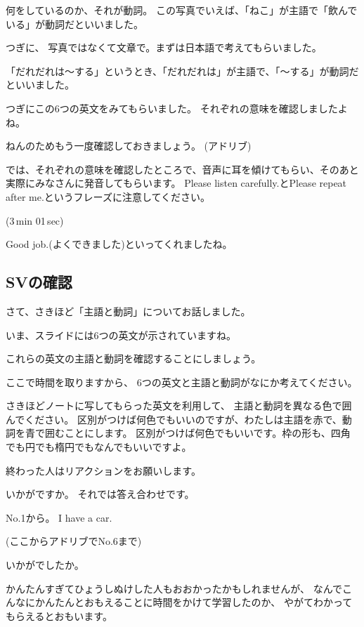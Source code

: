 \documentclass[book,jafontscale=0.9247]{jlreq}
\begin{document}
何をしているのか、それが動詞。
この写真でいえば、「ねこ」が主語で「飲んでいる」が動詞だといいました。

{\large \ComputerMouse}

つぎに、
写真ではなくて文章で。まずは日本語で考えてもらいました。

「だれだれは〜する」というとき、「だれだれは」が主語で、「〜する」が動詞だといいました。

{\large \ComputerMouse}

つぎにこの6つの英文をみてもらいました。
それぞれの意味を確認しましたよね。

ねんのためもう一度確認しておきましょう。
(アドリブ)

では、それぞれの意味を確認したところで、音声に耳を傾けてもらい、そのあと実際にみなさんに発音してもらいます。
Please listen carefully.とPlease repeat after me.というフレーズに注意してください。





\faVolumeUp{}(3\,min 01\,sec)

Good job.(よくできました)といってくれましたね。


\subsection{SVの確認}

さて、さきほど「主語と動詞」についてお話しました。

いま、スライドには6つの英文が示されていますね。

これらの英文の主語と動詞を確認することにしましょう。

ここで時間を取りますから、
6つの英文と主語と動詞がなにか考えてください。

さきほどノートに写してもらった英文を利用して、
主語と動詞を異なる色で囲んでください。
区別がつけば何色でもいいのですが、わたしは主語を赤で、動詞を青で囲むことにします。
区別がつけば何色でもいいです。枠の形も、四角でも円でも楕円でもなんでもいいですよ。

終わった人はリアクションをお願いします。

いかがですか。
それでは答え合わせです。

No.1から。
I have a car.

(ここからアドリブでNo.6まで)

いかがでしたか。

かんたんすぎてひょうしぬけした人もおおかったかもしれませんが、
なんでこんなにかんたんとおもえることに時間をかけて学習したのか、
やがてわかってもらえるとおもいます。
\end{document}
